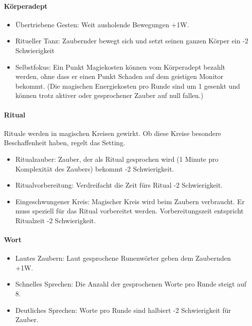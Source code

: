 \documentclass{article}
\begin{document}
\paragraph{Körperadept}

\begin{itemize}
\item Übertriebene Gesten: Weit ausholende Bewegungen +1W.
\item Ritueller Tanz: Zaubernder bewegt sich und setzt seinen ganzen Körper ein -2 Schwierigkeit
\item Selbstfokus: Ein Punkt Magiekosten können vom Körperadept bezahlt werden, ohne dass er einen Punkt Schaden auf dem geistigen Monitor bekommt. (Die magischen Energiekosten pro Runde sind um 1 gesenkt und können trotz aktiver oder gesprochener Zauber auf null fallen.)
\end{itemize}

\paragraph{Ritual}

Rituale werden in magischen Kreisen gewirkt. Ob diese Kreise besondere Beschaffenheit haben, regelt das Setting.

\begin{itemize}
\item Ritualzauber: Zauber, der als Ritual gesprochen wird (1 Minute pro Komplexität des Zaubers) bekommt -2 Schwierigkeit.
\item Ritualvorbereitung: Verdreifacht die Zeit fürs Ritual -2 Schwierigkeit.
\item Eingeschwungener Kreis: Magischer Kreis wird beim Zaubern verbraucht. Er muss speziell für das Ritual vorbereitet werden. Vorbereitungszeit entspricht Ritualzeit -2 Schwierigkeit.
\end{itemize}

\paragraph{Wort}

\begin{itemize}
\item Lautes Zaubern: Laut gesprochene Runenwörter geben dem Zaubernden +1W.
\item Schnelles Sprechen: Die Anzahl der gesprochenen Worte pro Runde steigt auf 8.
\item Deutliches Sprechen: Worte pro Runde sind halbiert -2 Schwierigkeit für Zauber.
\end{itemize}
\end{document}
